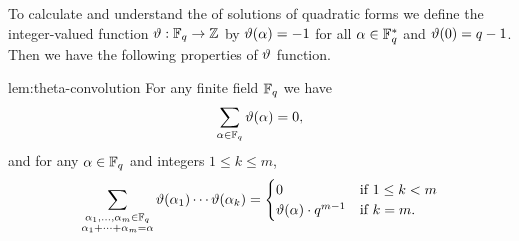 To calculate and understand the of solutions of quadratic forms we define the integer-valued function $\vartheta:\mathbb{F}_q\to\mathbb{Z}$ by $\vartheta(\alpha)=-1$ for all $\alpha\in\mathbb{F}_q^*$ and $\vartheta(0)=q-1$. Then we have the following properties of $\vartheta$ function.
\begin{lemma}{}{lem:theta-convolution}
  For any finite field $\mathbb{F}_q$ we have $$\sum_{\alpha\in\mathbb{F}_q}\vartheta(\alpha)=0,$$and for any $\alpha\in\mathbb{F}_q$ and integers $1\leq k\leq m$,
  $$\sum_{\substack{\alpha_1,\dots,\alpha_m\in\mathbb{F}_q\\ \alpha_1+\cdots+\alpha_m=\alpha}}\vartheta(\alpha_1)\cdots \vartheta(\alpha_k)=\begin{cases}
    0 & \text{if $1\leq k<m$}\\
    \vartheta(\alpha)\cdot q^{m-1} & \text{if $k=m$.}
  \end{cases}$$
\end{lemma}
